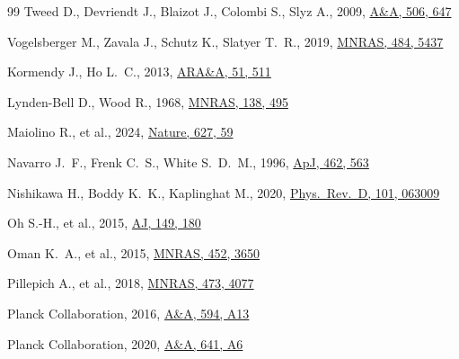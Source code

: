 \documentclass[fleqn,usenatbib]{mnras}
\begin{document}
\begin{thebibliography}{99}
Tweed D., Devriendt J., Blaizot J., Colombi S., Slyz A., 2009, \href{https://doi.org/10.1051/0004-6361/200810579}{A\&A, 506, 647}

Vogelsberger M., Zavala J., Schutz K., Slatyer T.~R., 2019, \href{https://doi.org/10.1093/mnras/sty2970}{MNRAS, 484, 5437}

Kormendy J., Ho L.~C., 2013, \href{https://doi.org/10.1146/annurev-astro-082708-101811}{ARA\&A, 51, 511}

Lynden-Bell D., Wood R., 1968, \href{https://doi.org/10.1093/mnras/138.4.495}{MNRAS, 138, 495}

Maiolino R., et al., 2024, \href{https://doi.org/10.1038/s41586-024-07052-5}{Nature, 627, 59}

Navarro J.~F., Frenk C.~S., White S.~D.~M., 1996, \href{https://doi.org/10.1086/177173}{ApJ, 462, 563}

Nishikawa H., Boddy K.~K., Kaplinghat M., 2020, \href{https://doi.org/10.1103/PhysRevD.101.063009}{Phys.\ Rev.\ D, 101, 063009}

Oh S.-H., et al., 2015, \href{https://doi.org/10.1088/0004-6256/149/6/180}{AJ, 149, 180}

Oman K.~A., et al., 2015, \href{https://doi.org/10.1093/mnras/stv1504}{MNRAS, 452, 3650}

Pillepich A., et al., 2018, \href{https://doi.org/10.1093/mnras/stx2656}{MNRAS, 473, 4077}

Planck Collaboration, 2016, \href{https://doi.org/10.1051/0004-6361/201525830}{A\&A, 594, A13}

Planck Collaboration, 2020, \href{https://doi.org/10.1051/0004-6361/201833910}{A\&A, 641, A6}


\end{thebibliography}
\end{document}
